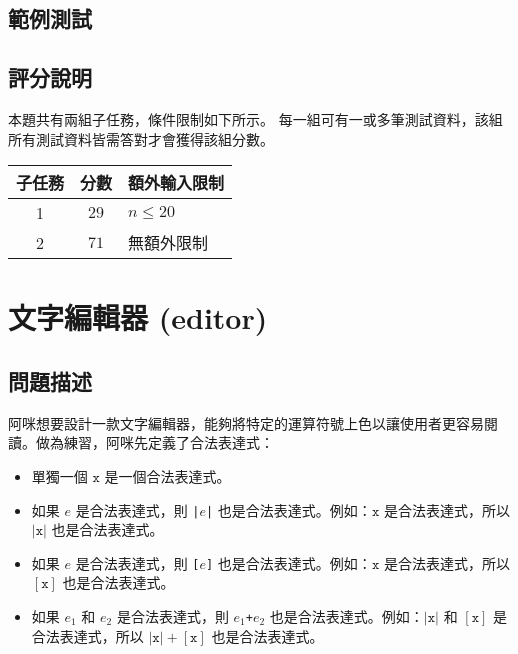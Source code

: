 \subsection{範例測試}

\begin{example}
%
%
\end{example}

\subsection{評分說明}

本題共有兩組子任務，條件限制如下所示。
每一組可有一或多筆測試資料，該組所有測試資料皆需答對才會獲得該組分數。

\begin{longtable}[]{@{}ccl@{}}
\toprule
子任務 & 分數 & 額外輸入限制 \\
\midrule
\endhead
1 & \(29\) & \(n \le 20\) \\
2 & \(71\) & 無額外限制 \\
\bottomrule
\end{longtable}

\section{文字編輯器 (editor)}

\subsection{問題描述}

阿咪想要設計一款文字編輯器，能夠將特定的運算符號上色以讓使用者更容易閱讀。做為練習，阿咪先定義了合法表達式：

\begin{itemize}
\tightlist
\item
  單獨一個 \(\mathtt{x}\) 是一個合法表達式。
\item
  如果 \(e\)\hspace{0pt} 是合法表達式，則 \texttt{|}\(e\)\texttt{|}
  也是合法表達式。例如：\(\mathtt{x}\) 是合法表達式，所以
  \(\mathtt{|x|}\) 也是合法表達式。
\item
  如果 \(e\)\hspace{0pt} 是合法表達式，則 \texttt{[}\(e\)\texttt{]}
  也是合法表達式。例如：\(\mathtt{x}\) 是合法表達式，所以
  \(\mathtt{[x]}\) 也是合法表達式。
\item
  如果 \(e_1\)\hspace{0pt} 和 \(e_2\) 是合法表達式，則
  \(e_1\)\texttt{+}\(e_2\) 也是合法表達式。例如：\(\mathtt{|x|}\) 和
  \(\mathtt{[x]}\) 是合法表達式，所以 \(\mathtt{|x|+[x]}\)
  也是合法表達式。
\end{itemize}

